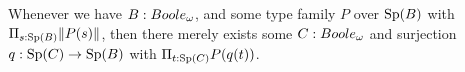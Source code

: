 
\begin{axiom}\label{AxLocalChoice}
  Whenever we have $B:\Boole$, and some type family $P$ over $\operatorname{Sp}(B)$ with 
  $\Pi_{s:\operatorname{Sp}(B)} \lVert P(s) \rVert$, then there 
  merely exists some $C:\Boole$ and surjection $q:\operatorname{Sp}(C)\to \operatorname{Sp}(B)$ with 
$  \Pi_{t:\operatorname{Sp}(C)} P(q(t))$.
\end{axiom}

